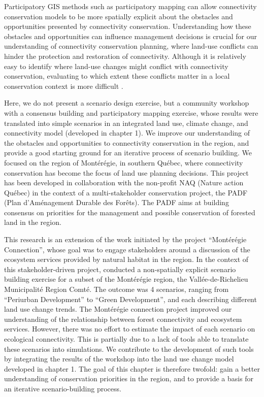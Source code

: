 Participatory GIS methods such as participatory mapping can allow connectivity conservation models to be more spatially explicit about the obstacles and opportunities presented by connectivity conservation. Understanding how these obstacles and opportunities can influence management decisions is crucial for our understanding of connectivity conservation planning, where land-use conflicts can hinder the protection and restoration of connectivity. Although it is relatively easy to identify where land-use changes might conflict with connectivity conservation, evaluating to which extent these conflicts matter in a local conservation context is more difficult \cite{mitchell_monteregie_2015}.

Here, we do not present a scenario design exercise, but a community workshop with a consensus building and participatory mapping exercise, whose results were translated into simple scenarios in an integrated land use, climate change, and connectivity model (developed in chapter 1). We improve our understanding of the obstacles and opportunities to connectivity conservation in the region, and provide a good starting ground for an iterative process of scenario building. We focused on the region of Montérégie, in southern Québec, where connectivity conservation has become the focus of land use planning decisions. This project has been developed in collaboration with the non-profit NAQ (Nature action Québec) in the context of a multi-stakeholder conservation project, the PADF (Plan d’Aménagement Durable des Forêts). The PADF aims at building consensus on priorities for the management and possible conservation of forested land in the region.

This research is an extension of the work initiated by the project “Montérégie Connection”, whose goal was to engage stakeholders around a discussion of the ecosystem services provided by natural habitat in the region. In the context of this stakeholder-driven project, \cite{mitchell_monteregie_2015} conducted a non-spatially explicit scenario building exercise for a subset of the Montérégie region, the Vallée-de-Richelieu Municipalité Region Comté. The outcome was 4 scenarios, ranging from “Periurban Development” to “Green Development”, and each describing different land use change trends. The Montérégie connection project improved our understanding of the relationship between forest connectivity and ecosystem services. However, there was no effort to estimate the impact of each scenario on ecological connectivity. This is partially due to a lack of tools able to translate these scenarios into simulations. We contribute to the development of such tools by integrating the results of the workshop into the land use change model developed in chapter 1. The goal of this chapter is therefore twofold: gain a better understanding of conservation priorities in the region, and to provide a basis for an iterative scenario-building process. \\


